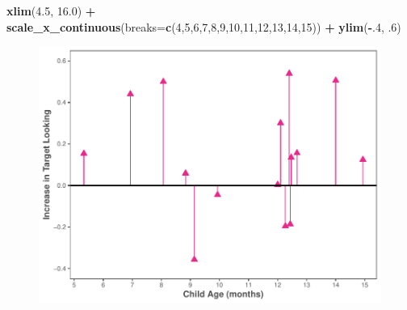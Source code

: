 \documentclass[
  doc,floatsintext]{apa6}
\newenvironment{Shaded}{\begin{snugshade}}{\end{snugshade}}
\newcommand{\AttributeTok}[1]{\textcolor[rgb]{0.13,0.29,0.53}{#1}}
\newcommand{\DecValTok}[1]{\textcolor[rgb]{0.00,0.00,0.81}{#1}}
\newcommand{\FloatTok}[1]{\textcolor[rgb]{0.00,0.00,0.81}{#1}}
\newcommand{\FunctionTok}[1]{\textcolor[rgb]{0.13,0.29,0.53}{\textbf{#1}}}
\newcommand{\NormalTok}[1]{#1}
\newcommand{\SpecialCharTok}[1]{\textcolor[rgb]{0.81,0.36,0.00}{\textbf{#1}}}
\begin{document}
\begin{Shaded}
\begin{Highlighting}[]
  \FunctionTok{xlim}\NormalTok{(}\FloatTok{4.5}\NormalTok{, }\FloatTok{16.0}\NormalTok{) }\SpecialCharTok{+}
  \FunctionTok{scale\_x\_continuous}\NormalTok{(}\AttributeTok{breaks=}\FunctionTok{c}\NormalTok{(}\DecValTok{4}\NormalTok{,}\DecValTok{5}\NormalTok{,}\DecValTok{6}\NormalTok{,}\DecValTok{7}\NormalTok{,}\DecValTok{8}\NormalTok{,}\DecValTok{9}\NormalTok{,}\DecValTok{10}\NormalTok{,}\DecValTok{11}\NormalTok{,}\DecValTok{12}\NormalTok{,}\DecValTok{13}\NormalTok{,}\DecValTok{14}\NormalTok{,}\DecValTok{15}\NormalTok{)) }\SpecialCharTok{+}
  \FunctionTok{ylim}\NormalTok{(}\SpecialCharTok{{-}}\NormalTok{.}\DecValTok{4}\NormalTok{, .}\DecValTok{6}\NormalTok{) }
\end{Highlighting}
\end{Shaded}

\begin{figure}

{\centering \includegraphics{revised_ms_analyses_files/figure-latex/r2-g-by-subject-plot-1} 

}

\caption{ }\label{fig:r2-g-by-subject-plot}
\end{figure}
\end{document}
